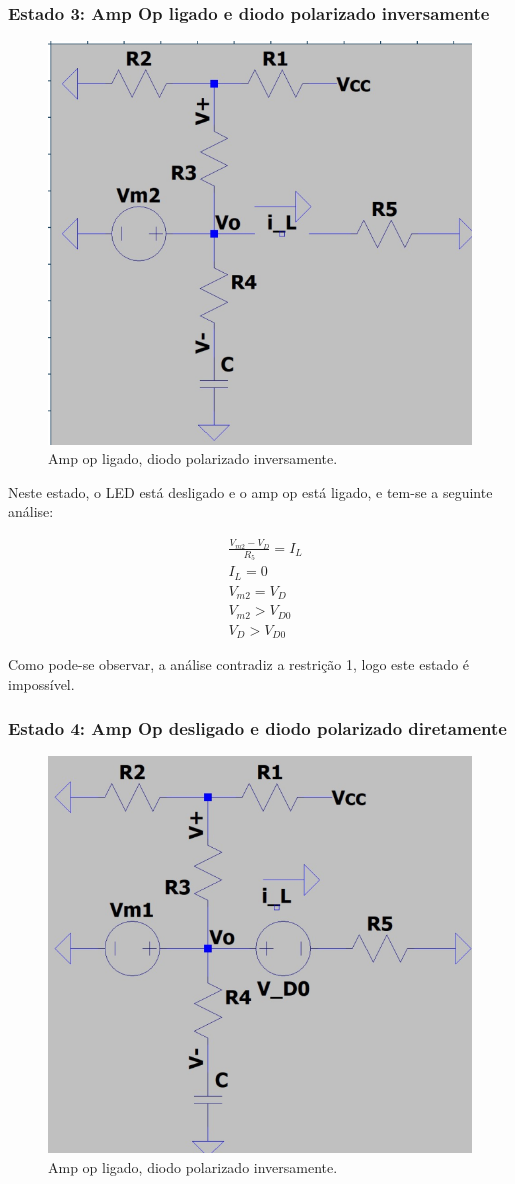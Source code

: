 \subsubsection{Estado 3: Amp Op ligado e diodo polarizado inversamente}

\begin{figure}[H]
    \centering
    \includegraphics[width=0.5\columnwidth]{images/ampop1diodo2.png}
    \caption{Amp op ligado, diodo polarizado inversamente.}
\end{figure}

Neste estado, o LED está desligado e o amp op está ligado, e tem-se a seguinte análise:

\begin{equation}
    \begin{aligned}
         & \frac{V_{m2} - V_{D}}{R_5} = I_L \\
         & I_L = 0                          \\
         & V_{m2} = V_{D}                   \\
         & V_{m2} > V_{D0}                  \\
         & V_D > V_{D0}
    \end{aligned}
\end{equation}

Como pode-se observar, a análise contradiz a restrição 1, logo este estado é impossível.

\subsubsection{Estado 4: Amp Op desligado e diodo polarizado diretamente}

\begin{figure}[H]
    \centering
    \includegraphics[width=0.5\columnwidth]{images/ampop2diodo1.png}
    \caption{Amp op ligado, diodo polarizado inversamente.}
\end{figure}

